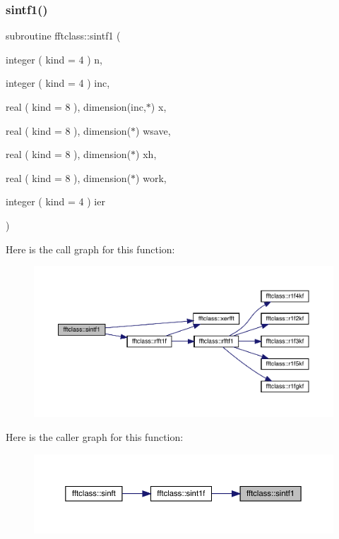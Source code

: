\subsubsection{\texorpdfstring{sintf1()}{sintf1()}}
{\footnotesize\ttfamily subroutine fftclass\+::sintf1 (\begin{DoxyParamCaption}\item[{integer ( kind = 4 )}]{n,  }\item[{integer ( kind = 4 )}]{inc,  }\item[{real ( kind = 8 ), dimension(inc,$\ast$)}]{x,  }\item[{real ( kind = 8 ), dimension($\ast$)}]{wsave,  }\item[{real ( kind = 8 ), dimension($\ast$)}]{xh,  }\item[{real ( kind = 8 ), dimension($\ast$)}]{work,  }\item[{integer ( kind = 4 )}]{ier }\end{DoxyParamCaption})}

Here is the call graph for this function\+:\nopagebreak
\begin{figure}[H]
\begin{center}
\leavevmode
\includegraphics[width=350pt]{namespacefftclass_aa79de4b10a068408990ac9ac8f32d134_cgraph}
\end{center}
\end{figure}
Here is the caller graph for this function\+:\nopagebreak
\begin{figure}[H]
\begin{center}
\leavevmode
\includegraphics[width=350pt]{namespacefftclass_aa79de4b10a068408990ac9ac8f32d134_icgraph}
\end{center}
\end{figure}
\mbox{\label{namespacefftclass_a4d9b6f96810b5b7a8b7dd38af74f5b55}} 
